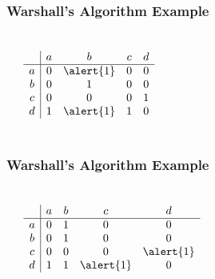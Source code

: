 \documentclass[dvipsnames]{beamer}
\begin{document}
\begin{frame}
  \frametitle{Warshall's Algorithm Example}

  \begin{example}
    \begin{columns}
      \begin{center}
      \end{center}

      \[
        \begin{array}{c|cccc}
              & a & b & c & d\\\hline
            a & 0 & \alert{1} & 0 & 0\\
            b & 0 & 1 & 0 & 0\\
            c & 0 & 0 & 0 & 1\\
            d & 1 & \alert{1} & 1 & 0
        \end{array}
      \]
    \end{columns}
  \end{example}
\end{frame}

\begin{frame}
  \frametitle{Warshall's Algorithm Example}

  \begin{example}
    \begin{columns}
      \begin{center}
      \end{center}

      \[
        \begin{array}{c|cccc}
              & a & b & c & d\\\hline
            a & 0 & 1 & 0 & 0\\
            b & 0 & 1 & 0 & 0\\
            c & 0 & 0 & 0 & \alert{1}\\
            d & 1 & 1 & \alert{1} & 0
        \end{array}
      \]
    \end{columns}
  \end{example}
\end{frame}
\end{document}
